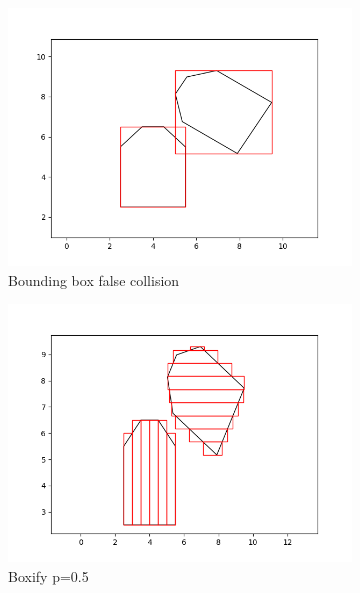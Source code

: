\documentclass[a4paper,12pt]{article}
\DeclareRobustCommand{\[}{\begin{equation}}
\DeclareRobustCommand{\]}{\end{equation}}
\numberwithin{equation}{section}
\numberwithin{algorithm}{section}
\begin{document}
\begin{figure}[H]
\centering
    \begin{subfigure}[b]{0.4\textwidth}
        \includegraphics[scale=0.3,width=\textwidth]{images/car_bounding_box.png}
        \caption{Bounding box false collision}
    \end{subfigure}
    \begin{subfigure}[b]{0.4\textwidth}
        \includegraphics[scale=0.3,width=\textwidth]{images/car_boxify_0_5.png}
        \caption{Boxify p=0.5}
    \end{subfigure}
    \begin{subfigure}[b]{0.4\textwidth}

\end{subfigure}
\end{figure}
\end{document}
